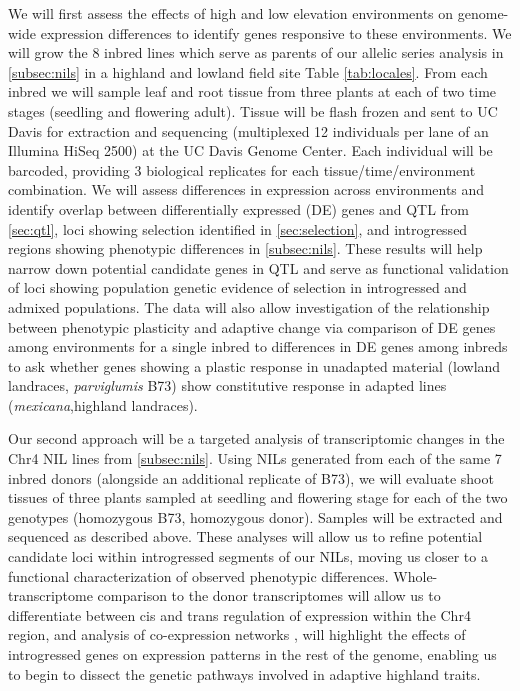 We will first assess the effects of high and low elevation environments on genome-wide expression differences to identify genes responsive to these environments.  We will grow the 8 inbred lines which serve as parents of our allelic series analysis in \ref{subsec:nils} in a highland and lowland field site Table \ref{tab:locales}.  From each inbred we will sample leaf and root tissue from three plants at each of two time stages (seedling and flowering adult). Tissue will be flash frozen and sent to UC Davis for extraction and sequencing (multiplexed 12 individuals per lane of an Illumina HiSeq 2500) at the UC Davis Genome Center. Each individual will be barcoded, providing 3 biological replicates for each tissue/time/environment combination. We will assess differences in expression across environments and identify overlap between differentially expressed (DE) genes and QTL from \ref{sec:qtl}, loci showing selection identified in \ref{sec:selection}, and introgressed regions showing phenotypic differences in \ref{subsec:nils}.   These results will help narrow down potential candidate genes in QTL and serve as functional validation of loci showing population genetic evidence of selection in introgressed and admixed populations.  The data will also allow investigation of the relationship between phenotypic plasticity and adaptive change \citep[c.f.][]{Rosas26082013} via comparison of DE genes among environments for a single inbred to differences in DE genes among inbreds to ask whether genes showing a plastic response in unadapted material (lowland landraces, \emph{parviglumis} B73) show constitutive response in adapted lines (\emph{mexicana},highland landraces).  

Our second approach will be a targeted analysis of transcriptomic changes in the Chr4 NIL lines from \ref{subsec:nils}.  Using NILs generated from each of the same 7 inbred donors (alongside an additional replicate of B73), we will evaluate shoot tissues of three plants sampled at seedling and flowering stage for each of the two genotypes (homozygous B73, homozygous donor).  Samples will be extracted and sequenced as described above. These analyses will allow us to refine potential candidate loci within introgressed segments of our NILs, moving us closer to a functional characterization of observed phenotypic differences. Whole-transcriptome comparison to the donor transcriptomes will allow us to differentiate between cis and trans regulation of expression within the Chr4 region, and analysis of co-expression networks \citep[c.f.][]{Swanson-Wagner02072012}, will highlight the effects of introgressed genes on expression patterns in the rest of the genome, enabling us to begin to dissect the genetic pathways involved in adaptive highland traits.

